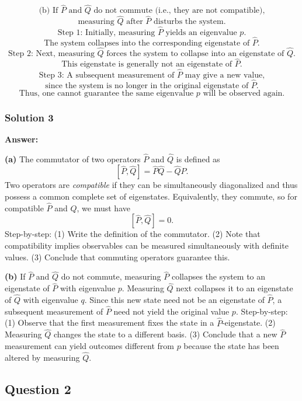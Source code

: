 \documentclass{article}
\begin{document}
\[
\text{(b) If }\hat{P}\text{ and }\hat{Q}\text{ do not commute (i.e., they are not compatible),}
\]
\[
\text{measuring }\hat{Q}\text{ after }\hat{P}\text{ disturbs the system.}
\]
\[
\text{Step 1: Initially, measuring }\hat{P}\text{ yields an eigenvalue }p.
\]
\[
\text{The system collapses into the corresponding eigenstate of }\hat{P}.
\]
\[
\text{Step 2: Next, measuring }\hat{Q}\text{ forces the system to collapse into an eigenstate of }\hat{Q}.
\]
\[
\text{This eigenstate is generally not an eigenstate of }\hat{P}.
\]
\[
\text{Step 3: A subsequent measurement of }\hat{P}\text{ may give a new value,}
\]
\[
\text{since the system is no longer in the original eigenstate of }\hat{P}.
\]
\[
\text{Thus, one cannot guarantee the same eigenvalue }p\text{ will be observed again.}
\]


\subsubsection{Solution 3}

\noindent
\textbf{Answer:}

\noindent
\textbf{(a)} 
The commutator of two operators $\hat{P}$ and $\hat{Q}$ is defined as 
\[
[\hat{P}, \hat{Q}] = \hat{P}\hat{Q} - \hat{Q}\hat{P}.
\]
Two operators are \emph{compatible} if they can be simultaneously diagonalized and thus possess a common complete set of eigenstates. Equivalently, they commute, so for compatible $\hat{P}$ and $\hat{Q}$, we must have
\[
[\hat{P}, \hat{Q}] = 0.
\]
Step-by-step: (1) Write the definition of the commutator. (2) Note that compatibility implies observables can be measured simultaneously with definite values. (3) Conclude that commuting operators guarantee this.

\noindent
\textbf{(b)}
If $\hat{P}$ and $\hat{Q}$ do not commute, measuring $\hat{P}$ collapses the system to an eigenstate of $\hat{P}$ with eigenvalue $p$. Measuring $\hat{Q}$ next collapses it to an eigenstate of $\hat{Q}$ with eigenvalue $q$. Since this new state need not be an eigenstate of $\hat{P}$, a subsequent measurement of $\hat{P}$ need not yield the original value $p$. Step-by-step: (1) Observe that the first measurement fixes the state in a $\hat{P}$-eigenstate. (2) Measuring $\hat{Q}$ changes the state to a different basis. (3) Conclude that a new $\hat{P}$ measurement can yield outcomes different from $p$ because the state has been altered by measuring $\hat{Q}$.

\subsection{Question 2}
\end{document}
